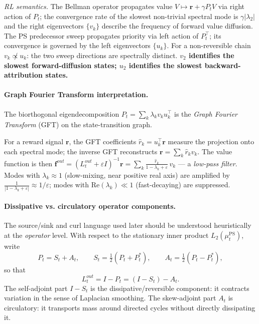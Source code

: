 \documentclass[10pt,a4paper]{article}
\begin{document}
\textit{RL semantics.}  The Bellman operator propagates value
$V \mapsto \mathbf{r} + \gamma P_t V$ via right action of $P_t$; the convergence rate
of the slowest non-trivial spectral mode is $\gamma|\lambda_2|$ and the right eigenvectors $\{v_k\}$ describe the frequency
of forward value diffusion.  The PS predecessor sweep propagates priority via
left action of $P_t^\top$; its convergence is governed by the left eigenvectors
$\{u_k\}$.  For a non-reversible chain $v_k \not\propto u_k$: the two sweep
directions are spectrally distinct.  \textbf{$v_2$ identifies the slowest forward-diffusion states; $u_2$ identifies the slowest backward-attribution states.}


\paragraph{Graph Fourier Transform interpretation.}
The biorthogonal eigendecomposition $P_t = \sum_k \lambda_k v_k u_k^\top$ is the
\emph{Graph Fourier Transform} (GFT) on the state-transition graph.

For a reward signal $\mathbf{r}$, the GFT coefficients $\hat{r}_k = u_k^\top \mathbf{r}$
measure the projection onto each spectral mode; the inverse GFT reconstructs
$\mathbf{r} = \sum_k \hat{r}_k v_k$.  The value function is then
$\mathbf{f}^{out} = (L^{out}_t+\varepsilon I)^{-1}\mathbf{r} = \sum_k \frac{\hat{r}_k}{1-\lambda_k+\varepsilon}\,v_k$ --- a \emph{low-pass filter}.
Modes with $\lambda_k\approx 1$ (slow-mixing, near positive real axis) are amplified by $\frac{1}{|1-\lambda_k+\varepsilon|}\approx 1/\varepsilon$; modes with $\mathrm{Re}(\lambda_k) \ll 1$ (fast-decaying) are suppressed.


\paragraph{Dissipative vs. circulatory operator components.}
The source/sink and curl language used later should be understood heuristically at the
\emph{operator} level.  With respect to the stationary inner product
$L_2(\mu_t^{\mathrm{PS}})$, write
\[
  P_t = S_t + A_t,
  \qquad
  S_t = \tfrac{1}{2}(P_t + P_t^*),
  \qquad
  A_t = \tfrac{1}{2}(P_t - P_t^*),
\]
so that
\[
  L^{out}_t = I - P_t = (I-S_t) - A_t.
\]
The self-adjoint part $I-S_t$ is the dissipative/reversible component:
it contracts variation in the sense of Laplacian smoothing.
The skew-adjoint part $A_t$ is circulatory: it transports mass around
directed cycles without directly dissipating it.
\end{document}
